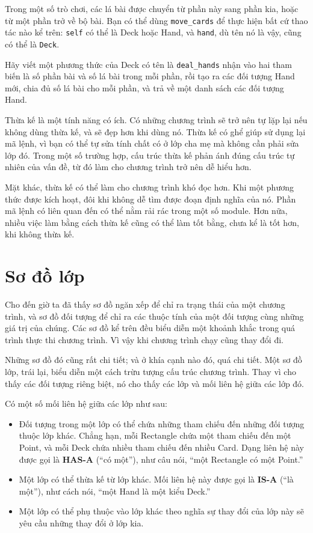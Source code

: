 \documentclass[11pt]{book}
\begin{document}
Trong một số trò chơi, các lá bài được chuyển từ phần này sang
phần kia, hoặc từ một phần trở về bộ bài. Bạn có thể dùng \verb"move_cards"
để thực hiện bất cứ thao tác nào kể trên:  {\tt self} có thể là Deck
hoặc Hand, và {\tt hand}, dù tên nó là vậy, cũng có thể là {\tt Deck}.

\begin{ex}
Hãy viết một phương thức của Deck có tên là \verb"deal_hands" nhận vào hai
tham biến là số phần bài và số lá bài trong mỗi phần, rồi tạo ra
các đối tượng Hand mới, chia đủ số lá bài cho mỗi phần, và trả về
một danh sách các đối tượng Hand.
\end{ex}

Thừa kế là một tính năng có ích. Có những chương trình sẽ trở nên
tự lặp lại nếu không dùng thừa kế, và sẽ đẹp hơn khi dùng nó. 
Thừa kế có ghể giúp sử dụng lại mã lệnh, vì bạn có thể tự sửa 
tính chất có ở lớp cha mẹ mà không cần phải sửa lớp đó. 
Trong một số trường hợp, cấu trúc thừa kế phản ánh đúng cấu trúc
tự nhiên của vấn đề, từ đó làm cho chương trình trở nên dễ hiểu hơn.

Mặt khác, thừa kế có thể làm cho chương trình khó đọc hơn. Khi một
phương thức được kích hoạt, đôi khi không dễ tìm được đoạn định nghĩa
của nó. Phần mã lệnh có liên quan đến có thể nằm rải rác trong một số
module. Hơn nữa, nhiều việc làm bằng cách thừa kế cũng có thể làm
tốt bằng, chưa kể là tốt hơn, khi không thừa kế.


\section{Sơ đồ lớp}

Cho đến giờ ta đã thấy sơ đồ ngăn xếp để chỉ ra trạng thái của 
một chương trình, và sơ đồ đối tượng để chỉ ra các thuộc tính của
một đối tượng cùng những giá trị của chúng. Các sơ đồ kể trên đều
biểu diễn một khoảnh khắc trong quá trình thực thi chương trình. Vì
vậy khi chương trình chạy cũng thay đổi đi.

Những sơ đồ đó cũng rất chi tiết; và ở khía cạnh nào đó, quá chi tiết.
Một sơ đồ lớp, trái lại, biểu diễn một cách trừu tượng cấu trúc
chương trình. Thay vì cho thấy các đối tượng riêng biệt, nó cho thấy
các lớp và mối liên hệ giữa các lớp đó.

Có một số mối liên hệ giữa các lớp như sau:

\begin{itemize}

\item Đối tượng trong một lớp có thể chứa những tham chiếu đến những
đối tượng thuộc lớp khác. Chẳng hạn, mỗi Rectangle chứa một tham chiếu
đến một Point, và mỗi Deck chứa nhiều tham chiếu đến nhiều Card.
Dạng liên hệ này được gọi là {\bf HAS-A} (``có một''), như câu nói, ``một Rectangle
có một Point.''

\item Một lớp có thể thừa kế từ lớp khác. Mối liên hệ này
được gọi là {\bf IS-A} (``là một''), như cách nói, ``một Hand là một kiểu Deck.''

\item Một lớp có thể phụ thuộc vào lớp khác theo nghĩa sự thay đổi của lớp này
sẽ yêu cầu những thay đổi ở lớp kia.
\end{itemize}
\end{document}
